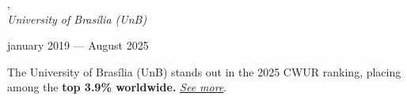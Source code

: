 , \\  
\textit{University of Brasília (UnB)}\strut \hfill january 2019 --- August 2025\\  

\vspace*{7pt}  

The University of Brasília (UnB) stands out in the 2025 CWUR ranking, placing among the \textbf{top 3.9\% worldwide.}
\href{https://cwur.org/2025/university-of-brasilia.php}{ \textit{See more}}.

